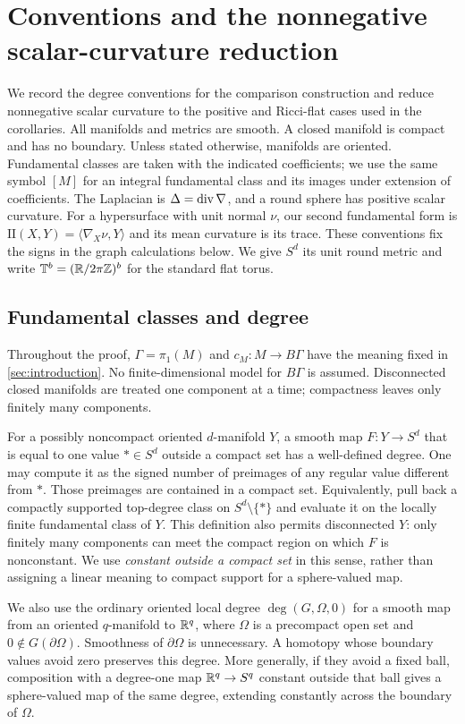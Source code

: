 \section{Conventions and the nonnegative scalar-curvature reduction}
\label{sec:reductions}

We record the degree conventions for the comparison construction and reduce
nonnegative scalar curvature to the positive and Ricci-flat cases used in the
corollaries. All manifolds and metrics are smooth. A closed manifold is compact
and has no boundary. Unless stated otherwise, manifolds are oriented.
Fundamental classes are taken with the indicated coefficients; we use the same
symbol $[M]$ for
an integral fundamental class and its images under extension of coefficients.
The Laplacian is $\Delta=\operatorname{div}\nabla$, and a round sphere has positive scalar
curvature. For a hypersurface with unit normal $\nu$, our second fundamental
form is $\mathrm{II}(X,Y)=\langle\nabla_X\nu,Y\rangle$ and its mean curvature
is its trace. These conventions fix the signs in the graph calculations below.
We give $S^d$ its unit round metric and write
$\mathbb T^b=(\mathbb R/2\pi\mathbb Z)^b$ for the standard flat torus.

\subsection{Fundamental classes and degree}

Throughout the proof, $\Gamma=\pi_1(M)$ and $c_M:M\to B\Gamma$
have the meaning fixed in \cref{sec:introduction}. No finite-dimensional
model for $B\Gamma$ is assumed. Disconnected closed manifolds are treated
one component at a time; compactness leaves only finitely many components.

For a possibly noncompact oriented $d$-manifold $Y$, a smooth map
$F:Y\to S^d$ that is equal to one value $*\in S^d$ outside a compact set has
a well-defined degree. One may compute it as the signed number of preimages
of any regular value different from $*$. Those preimages are contained in a
compact set. Equivalently, pull back a compactly supported top-degree class on
$S^d\setminus\{*\}$ and evaluate it on the locally finite fundamental class
of $Y$. This definition also permits disconnected $Y$: only finitely many
components can meet the compact region on which $F$ is nonconstant. We use
\emph{constant outside a compact set} in this sense, rather than assigning a
linear meaning to compact support for a sphere-valued map.

We also use the ordinary oriented local degree $\deg(G,\Omega,0)$ for a
smooth map from an oriented $q$-manifold to $\mathbb R^q$, where $\Omega$ is a
precompact open set and $0\notin G(\partial\Omega)$. Smoothness of
$\partial\Omega$ is unnecessary. A homotopy whose boundary values avoid zero
preserves this degree. More generally, if they avoid a fixed ball, composition
with a degree-one map $\mathbb R^q\to S^q$ constant outside that ball gives a
sphere-valued map of the same degree, extending constantly across the boundary
of $\Omega$.

